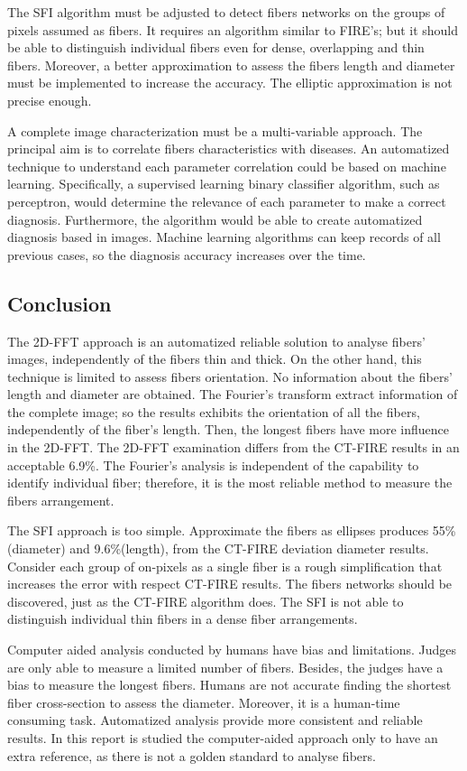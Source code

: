 \documentclass[12pt,a4paper]{article}
\begin{document}
The SFI algorithm must be adjusted to detect fibers networks on the groups of pixels assumed as fibers. It requires an algorithm similar to FIRE's; but it should be able to distinguish individual fibers even for dense, overlapping and thin fibers. Moreover, a better approximation to assess the fibers length and diameter must be implemented to increase the accuracy. The elliptic approximation is not precise enough.

A complete image characterization must be a multi-variable approach. The principal aim is to correlate fibers characteristics with diseases. An automatized technique to understand each parameter correlation could be based on machine learning. Specifically, a supervised learning binary classifier algorithm, such as perceptron, would determine the relevance of each parameter to make a correct diagnosis. Furthermore, the algorithm would be able to create automatized diagnosis based in images. Machine learning algorithms can keep records of all  previous cases, so the diagnosis accuracy increases over the time. 

\subsection{Conclusion}
The 2D-FFT approach is an automatized reliable solution to analyse fibers' images, independently of the fibers thin and thick. On the other hand, this technique is limited to assess fibers orientation. No information about the fibers' length and diameter are obtained. The Fourier's transform extract information of the complete image; so the results exhibits the orientation of all the fibers, independently of the fiber's length. Then, the longest fibers have more influence in the 2D-FFT. The 2D-FFT examination differs from the CT-FIRE results in an acceptable 6.9\%. The Fourier's analysis is independent of the capability to identify individual fiber; therefore, it is the most reliable method to measure the fibers arrangement.

The SFI approach is too simple. Approximate the fibers as ellipses produces 55\% (diameter) and 9.6\%(length), from the CT-FIRE deviation diameter results. Consider each group of on-pixels as a single fiber is a rough simplification that increases the error with respect CT-FIRE results. The fibers networks should be discovered, just as the CT-FIRE algorithm does. The SFI is not able to distinguish individual thin fibers in a dense fiber arrangements. 

Computer aided analysis conducted by humans have bias and limitations. Judges are only able to measure a limited number of fibers. Besides, the judges have a bias to measure the longest fibers. Humans are not accurate finding the shortest fiber cross-section to assess the diameter. Moreover, it is a human-time consuming task. Automatized analysis provide more consistent and reliable results. In this report is studied the computer-aided approach only to have an extra reference, as there is not a golden standard to analyse fibers. 
\end{document}

